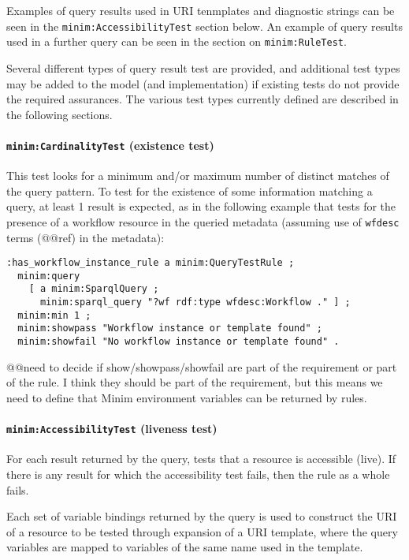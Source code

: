 \documentclass[]{article}
\begin{document}
Examples of query results used in URI tenmplates and diagnostic strings
can be seen in the \texttt{minim:AccessibilityTest} section below. An
example of query results used in a further query can be seen in the
section on \texttt{minim:RuleTest}.

Several different types of query result test are provided, and
additional test types may be added to the model (and implementation) if
existing tests do not provide the required assurances. The various test
types currently defined are described in the following sections.

\paragraph{\texttt{minim:CardinalityTest} (existence test)}

This test looks for a minimum and/or maximum number of distinct matches
of the query pattern. To test for the existence of some information
matching a query, at least 1 result is expected, as in the following
example that tests for the presence of a workflow resource in the
queried metadata (assuming use of \texttt{wfdesc} terms (@@ref) in the
metadata):

\begin{verbatim}
:has_workflow_instance_rule a minim:QueryTestRule ;
  minim:query 
    [ a minim:SparqlQuery ; 
      minim:sparql_query "?wf rdf:type wfdesc:Workflow ." ] ;
  minim:min 1 ;
  minim:showpass "Workflow instance or template found" ;
  minim:showfail "No workflow instance or template found" .
\end{verbatim}

@@need to decide if show/showpass/showfail are part of the requirement
or part of the rule. I think they should be part of the requirement, but
this means we need to define that Minim environment variables can be
returned by rules.

\paragraph{\texttt{minim:AccessibilityTest} (liveness test)}

For each result returned by the query, tests that a resource is
accessible (live). If there is any result for which the accessibility
test fails, then the rule as a whole fails.

Each set of variable bindings returned by the query is used to construct
the URI of a resource to be tested through expansion of a URI template,
where the query variables are mapped to variables of the same name used
in the template.
\end{document}
